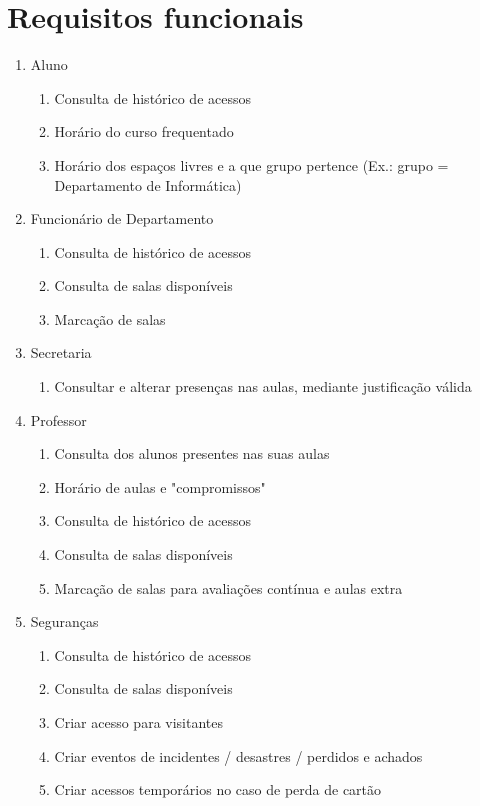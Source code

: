 \documentclass[a4paper]{report}
\begin{document}
\section{Requisitos funcionais}
\begin{enumerate}
\item Aluno
	\begin{enumerate}
	\item Consulta de histórico de acessos
    \item Horário do curso frequentado
    \item Horário dos espaços livres e a que grupo pertence (Ex.: grupo = Departamento de Informática)
	\end{enumerate}
\item Funcionário de Departamento
	\begin{enumerate}
    \item Consulta de histórico de acessos
    \item Consulta de salas disponíveis
    \item Marcação de salas
	\end{enumerate}
\item Secretaria
	\begin{enumerate}
    \item Consultar e alterar presenças nas aulas, mediante justificação válida
	\end{enumerate}
\item Professor
	\begin{enumerate}
	\item Consulta dos alunos presentes nas suas aulas
    \item Horário de aulas e "compromissos"
    \item Consulta de histórico de acessos
    \item Consulta de salas disponíveis
    \item Marcação de salas para avaliações contínua e aulas extra
	\end{enumerate}
\item Seguranças
	\begin{enumerate}
    \item Consulta de histórico de acessos
    \item Consulta de salas disponíveis
    \item Criar acesso para visitantes
    \item Criar eventos de incidentes / desastres / perdidos e achados
    \item Criar acessos temporários no caso de perda de cartão

\end{enumerate}
\end{enumerate}
\end{document}
